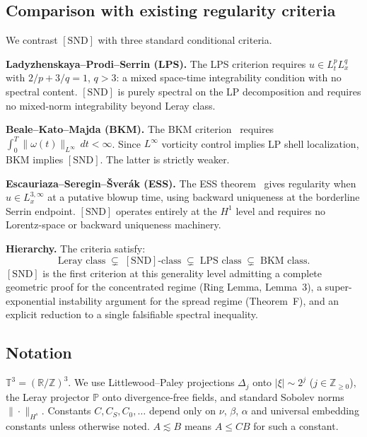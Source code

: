 \documentclass[11pt]{article}
\newcommand{\norm}[2]{\|{#1}\|_{#2}}
\newcommand{\T}{\mathbb{T}}
\newcommand{\R}{\mathbb{R}}
\newcommand{\Z}{\mathbb{Z}}
\newcommand{\PP}{\mathbb{P}}
\begin{document}
\subsection{Comparison with existing regularity criteria}

We contrast $[\mathrm{SND}]$ with three standard conditional criteria.

\medskip\noindent\textbf{Ladyzhenskaya--Prodi--Serrin (LPS).}
The LPS criterion requires $u\in L^p_t L^q_x$ with $2/p+3/q=1$, $q>3$:
a mixed space-time integrability condition with no spectral content.
$[\mathrm{SND}]$ is purely spectral on the LP decomposition and
requires no mixed-norm integrability beyond Leray class.

\medskip\noindent\textbf{Beale--Kato--Majda (BKM).}
The BKM criterion~\cite{BKM1984} requires
$\int_0^T \|\omega(t)\|_{L^\infty}\,dt < \infty$.
Since $L^\infty$ vorticity control implies LP shell localization,
BKM implies $[\mathrm{SND}]$. The latter is strictly weaker.

\medskip\noindent\textbf{Escauriaza--Seregin--\v{S}ver\'{a}k (ESS).}
The ESS theorem~\cite{ESS2003} gives regularity when $u\in L^{3,\infty}_x$
at a putative blowup time, using backward uniqueness at the borderline
Serrin endpoint. $[\mathrm{SND}]$ operates entirely at the $H^1$ level
and requires no Lorentz-space or backward uniqueness machinery.

\medskip\noindent\textbf{Hierarchy.}
The criteria satisfy:
\[
  \text{Leray class}
  \;\subsetneq\;
  [\mathrm{SND}]\text{-class}
  \;\subsetneq\;
  \text{LPS class}
  \;\subsetneq\;
  \text{BKM class}.
\]
$[\mathrm{SND}]$ is the first criterion at this generality level
admitting a complete geometric proof for the concentrated regime
(Ring Lemma, Lemma~3), a super-exponential instability argument
for the spread regime (Theorem~F), and an explicit reduction to
a single falsifiable spectral inequality.

\subsection{Notation}

$\T^3=(\R/\Z)^3$. We use Littlewood--Paley projections $\Delta_j$
onto $|\xi|\sim 2^j$ ($j\in\Z_{\ge0}$), the Leray projector
$\PP$ onto divergence-free fields, and standard Sobolev norms
$\norm{\cdot}{H^s}$. Constants $C, C_S, C_0,\ldots$ depend only
on $\nu$, $\beta$, $\alpha$ and universal embedding constants
unless otherwise noted. $A\lesssim B$ means $A\le CB$ for
such a constant.
\end{document}

